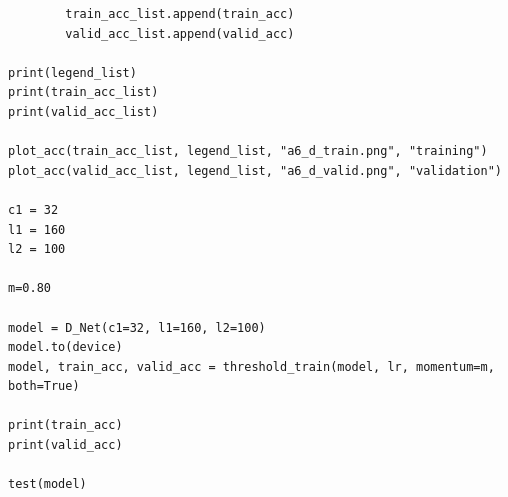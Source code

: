 \documentclass{article}
\newcommand{\1}{\mathbf{1}}
\begin{document}
{\begin{verbatim}
        train_acc_list.append(train_acc)
        valid_acc_list.append(valid_acc)

print(legend_list)
print(train_acc_list)
print(valid_acc_list)

plot_acc(train_acc_list, legend_list, "a6_d_train.png", "training")
plot_acc(valid_acc_list, legend_list, "a6_d_valid.png", "validation")

c1 = 32
l1 = 160
l2 = 100

m=0.80

model = D_Net(c1=32, l1=160, l2=100)
model.to(device)
model, train_acc, valid_acc = threshold_train(model, lr, momentum=m, both=True)

print(train_acc)
print(valid_acc)

test(model)
\end{verbatim}

}
\end{document}
